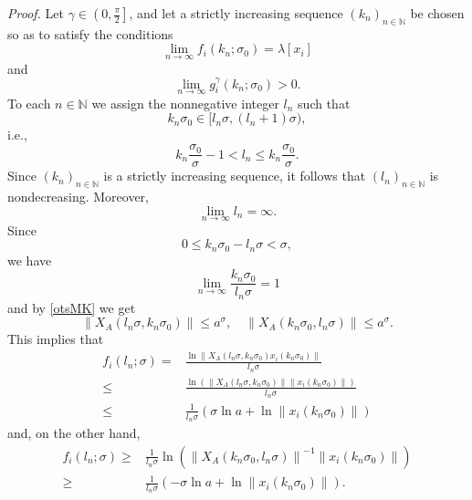 \documentclass[11pt]{article}
\begin{document}
\emph{Proof.}
Let $\gamma \in \left( 0,\frac{\pi }{2}\right] $, and let a strictly
increasing sequence $( k_{n}) _{n\in \mathbb{N}}$ be chosen so as
to satisfy the conditions%
\begin{equation*}
\lim_{n\to \infty }f_{i}( k_{n};\sigma _{0}) =\lambda 
[ x_{i}]
\end{equation*}%
and 
\begin{equation*}
\lim_{n\to \infty }g_{i}^{\gamma }( k_{n};\sigma _{0}) >0.
\end{equation*}%
To each $n\in \mathbb{N}$ we assign the nonnegative integer $l_{n}$ such that%
\begin{equation}
k_{n}\sigma _{0}\in [ l_{n}\sigma ,( l_{n}+1) \sigma )
,  \label{5}
\end{equation}%
i.e.,%
\begin{equation*}
k_{n}\frac{\sigma _{0}}{\sigma }-1<l_{n}\le k_{n}\frac{\sigma _{0}}{\sigma }%
.
\end{equation*}%
Since $( k_{n}) _{n\in \mathbb{N}}$ is a strictly increasing
sequence, it follows that $( l_{n}) _{n\in \mathbb{N}}$ is
nondecreasing. Moreover,%
\begin{equation*}
\lim_{n\to \infty }l_{n}=\infty .
\end{equation*}%
Since 
\begin{equation*}
0\le k_{n}\sigma _{0}-l_{n}\sigma <\sigma ,
\end{equation*}%
we have 
\begin{equation}
\lim_{n\to \infty }\frac{k_{n}\sigma _{0}}{l_{n}\sigma }=1
\label{X1}
\end{equation}%
and by \eqref{otsMK} we get%
\begin{equation}
\left\| X_{A}( l_{n}\sigma ,k_{n}\sigma _{0}) \right\| \le
a^{\sigma },\quad \left\| X_{A}( k_{n}\sigma _{0},l_{n}\sigma
) \right\| \le a^{\sigma }.  \label{X}
\end{equation}%
This implies that%
\begin{align*}
f_{i}( l_{n};\sigma ) = & \frac{\ln \left\| X_{A}(
l_{n}\sigma ,k_{n}\sigma _{0}) x_{i}( k_{n}\sigma _{0})
\right\| }{l_{n}\sigma }\\
\le & \frac{\ln ( \left\| X_{A}( l_{n}\sigma ,k_{n}\sigma _{0})
\right\| \left\| x_{i}( k_{n}\sigma _{0}) \right\|
) }{l_{n}\sigma }\\
\le  & \frac{1}{l_{n}\sigma }( \sigma \ln a+\ln \left\| x_{i}(
k_{n}\sigma _{0}) \right\| )
\end{align*}%
and, on the other hand,%
\begin{align*}
f_{i}( l_{n};\sigma ) \ge & \frac{1}{l_{n}\sigma }\ln \left(
\left\| X_{A}( k_{n}\sigma _{0},l_{n}\sigma ) \right\|
^{-1}\left\| x_{i}( k_{n}\sigma _{0}) \right\| \right) \\
\ge & \frac{1}{l_{n}\sigma }( -\sigma \ln a+\ln \left\| x_{i}(
k_{n}\sigma _{0}) \right\| ) .
\end{align*}%
\end{document}

